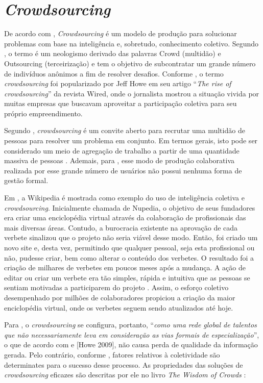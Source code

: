 \section{\textit{Crowdsourcing}}
\label{sc:crowdsourcing}

De acordo com \cite{brabham2008}, \textit{Crowdsourcing} é um modelo de produção para solucionar problemas com base na inteligência e, sobretudo, conhecimento coletivo. Segundo \cite{schenk2009}, o termo é um neologismo derivado das palavras Crowd (multidão) e Outsourcing (terceirização) e tem o objetivo de subcontratar um grande número de indivíduos anônimos a fim de resolver desafios.  Conforme \cite{Paraschakis2013}, o termo \textit{crowdsourcing} foi popularizado por Jeff Howe em seu artigo “\textit{The rise of crowdsourcing}” \citep{howe2006} da revista Wired, onde o jornalista mostrou a situação vivida por muitas empresas que buscavam aproveitar a participação coletiva para seu próprio empreendimento.  

Segundo \cite{Hu2012}, \textit{crowdsourcing} é um convite aberto para recrutar uma multidão de pessoas para resolver um problema em conjunto. Em termos gerais, isto pode ser considerado um meio de agregação de trabalho a partir de uma quantidade massiva de pessoas \citep{surowiecki2005}. Ademais, para \cite{pintado2011},  esse modo de produção colaborativa realizada por esse grande número de usuários não possui nenhuma forma de gestão formal.

Em \cite{pintado2011}, a Wikipedia é mostrada como exemplo do uso de inteligência coletiva e \textit{crowdsourcing}. Inicialmente chamada de Nupedia, o objetivo de seus fundadores era criar uma enciclopédia virtual através da colaboração de profissionais das mais diversas áreas. Contudo, a burocracia existente na aprovação de cada verbete sinalizou que o projeto não seria viável desse modo. Então, foi criado um novo site e, desta vez, permitindo que qualquer pessoal, seja esta profissional ou não, pudesse criar, bem como alterar o conteúdo dos verbetes. O resultado foi a criação de milhares de verbetes em poucos meses após a mudança. A ação de editar ou criar um verbete era tão simples, rápida e intuitiva que as pessoas se sentiam motivadas a participarem do projeto \citep{pintado2011}. Assim, o esforço coletivo desempenhado por milhões de colaboradores propiciou a criação da maior enciclopédia virtual, onde os verbetes seguem sendo atualizados até hoje.   

Para \cite{pintado2011}, o \textit{crowdsourcing} se configura, portanto, “\textit{como uma rede global de talentos que não necessariamente leva em consideração as vias formais de especialização}”, o que de acordo com \cite{surowiecki2005} e [Howe 2009], não causa perda de qualidade da informação gerada. Pelo contrário, conforme  \cite{surowiecki2005}, fatores relativos à coletividade são determinates para o sucesso desse processo. As propriedades das soluções de \textit{crowdsourcing} eficazes são descritas por ele no livro \textit{The Wisdom of Crowds} \citep{surowiecki2005}: 

